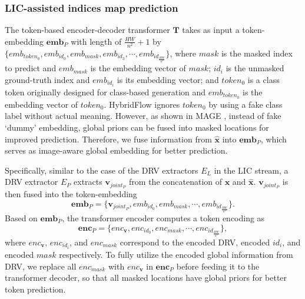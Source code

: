 \subsubsection{LIC-assisted indices map prediction}
The token-based encoder-decoder transformer $\textbf{T}$ takes as input a token-embedding $\textbf{emb}_{P}$ with length of $\frac{HW}{n^2}\!+\!1$ by $\{emb_{token_0}, emb_{id_0}, emb_{mask}, emb_{id_3}, \cdots, emb_{id_{\frac{HW}{n^2}}}\}$, where $mask$ is the masked index to predict and $emb_{mask}$ is the embedding vector of $mask$; $id_{i}$ is the unmasked ground-truth index and $emb_{id_i}$ is its embedding vector; and $token_0$ is a  class token originally designed for class-based generation and $emb_{token_0}$ is the embedding vector of $token_0$. HybridFlow \cite{lu2024hybridflow} ignores $token_0$ by using a fake class label without actual meaning. However, as shown in MAGE \cite{li2023mage}, instead of fake `dummy' embedding, global priors can be fused into masked locations for improved prediction. Therefore, we fuse information from ${\hat{\textbf{x}}}$ into $\textbf{emb}_{P}$, which serves as image-aware global embedding for better prediction. 

Specifically, similar to the case of the DRV extractors $E_L$ in the LIC stream, a DRV extractor $E_{P}$ extracts $\textbf{v}_{joint_{P}}$ from the concatenation of $\textbf{x}$ and $\hat{\textbf{x}}$.
$\textbf{v}_{joint_{P}}$ is then fused into the token-embedding 
\begin{equation}
    \textbf{emb}_P = \{\textbf{v}_{joint_{P}}, emb_{id_0}, emb_{mask}, \cdots, emb_{id_{\frac{HW}{n^2}}}\}.
\end{equation}
Based on $\textbf{emb}_{P}$, the transformer encoder computes a token encoding as 
\begin{equation}
    \textbf{enc}_{P} = \{ enc_{\mathbf{v}}, enc_{id_0}, enc_{mask}, \cdots, enc_{id_{\frac{HW}{n^2}}} \},
\end{equation}
where $enc_{\mathbf{v}}$, $enc_{id_i}$, and $enc_{mask}$ correspond to the encoded DRV, encoded $id_i$, and encoded $mask$ respectively. To fully utilize the encoded global information from DRV, we replace all $enc_{mask}$ with $enc_{\mathbf{v}}$ in $\textbf{enc}_{P}$ before feeding it to the transformer decoder, so that all masked locations have global priors for better token prediction.

